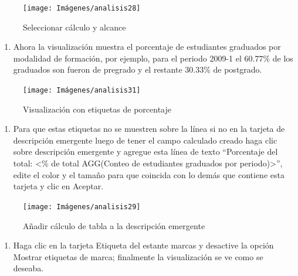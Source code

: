 \documentclass[
]{book}
\providecommand{\tightlist}{%
  \setlength{\itemsep}{0pt}\setlength{\parskip}{0pt}}
\begin{document}
\begin{figure}

{\centering \texttt{[image: Imágenes/analisis28]} 

}

\caption{Seleccionar cálculo y alcance}\label{fig:editarcalculodetabla-fig}
\end{figure}

\begin{enumerate}
\def\labelenumi{\arabic{enumi}.}
\setcounter{enumi}{4}
\tightlist
\item
  Ahora la visualización muestra el porcentaje de estudiantes graduados por modalidad de formación, por ejemplo, para el periodo 2009-1 el \(60.77\%\) de los graduados son fueron de pregrado y el restante \(30.33\%\) de postgrado.
\end{enumerate}

\begin{figure}

{\centering \texttt{[image: Imágenes/analisis31]} 

}

\caption{Visualización con etiquetas de porcentaje}\label{fig:etiquetasenporcentaje-fig}
\end{figure}

\begin{enumerate}
\def\labelenumi{\arabic{enumi}.}
\setcounter{enumi}{5}
\tightlist
\item
  Para que estas etiquetas no se muestren sobre la línea si no en la tarjeta de descripción emergente luego de tener el campo calculado creado haga clic sobre descripción emergente y agregue esta línea de texto ``Porcentaje del total: \textless\% de total AGG(Conteo de estudiantes graduados por periodo)\textgreater{}'', edite el color y el tamaño para que coincida con lo demás que contiene esta tarjeta y clic en Aceptar.
\end{enumerate}

\begin{figure}

{\centering \texttt{[image: Imágenes/analisis29]} 

}

\caption{Añadir cálculo de tabla a la descripción emergente}\label{fig:añadircalculodetablaadescripcion-fig}
\end{figure}

\begin{enumerate}
\def\labelenumi{\arabic{enumi}.}
\setcounter{enumi}{5}
\tightlist
\item
  Haga clic en la tarjeta Etiqueta del estante marcas y desactive la opción Mostrar etiquetas de marca; finalmente la visualización se ve como se deseaba.
\end{enumerate}
\end{document}
